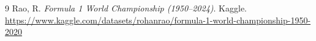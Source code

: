 \documentclass[11pt,a4paper]{article}
\begin{document}
\begin{thebibliography}{9}
    Rao, R. \emph{Formula 1 World Championship (1950--2024)}.
    Kaggle. \url{https://www.kaggle.com/datasets/rohanrao/formula-1-world-championship-1950-2020}
\end{thebibliography}
\end{document}
